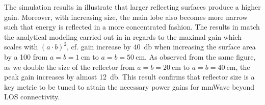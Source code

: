 The simulation results in  illustrate that larger reflecting surfaces produce a higher gain. Moreover, with increasing size, the main lobe also becomes more narrow such that energy is reflected in a more concentrated fashion. The results in  match the analytical modeling carried out in  in regards to the maximal gain which scales with $(a\cdot b)^2$, cf. gain increase by \SI{40}{\decibel} when increasing the surface area by a \num{100} from $a=b=\SI{1}{\centi\meter}$ to $a=b=\SI{50}{\centi\meter}$. As observed from the same figure, as we double the size of the reflector from $a=b=\SI{20}{\centi\meter}$ to $a=b=\SI{40}{\centi\meter}$, the peak gain increases by almost \SI{12}{\decibel}. This result confirms that reflector size is a key metric to be tuned to attain the necessary power gains for mmWave beyond LOS connectivity.
